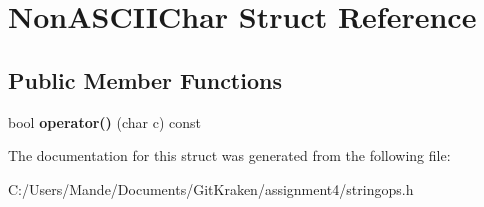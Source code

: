 \hypertarget{struct_non_a_s_c_i_i_char}{}\section{Non\+A\+S\+C\+I\+I\+Char Struct Reference}
\label{struct_non_a_s_c_i_i_char}
\subsection*{Public Member Functions}
\begin{DoxyCompactItemize}
\item 
\mbox{\label{struct_non_a_s_c_i_i_char_a69c2dace6982a86e8fc5fe0a1a8188ce}} 
bool {\bfseries operator()} (char c) const
\end{DoxyCompactItemize}


The documentation for this struct was generated from the following file\+:\begin{DoxyCompactItemize}
\item 
C\+:/\+Users/\+Mande/\+Documents/\+Git\+Kraken/assignment4/stringops.\+h\end{DoxyCompactItemize}

